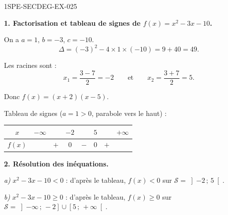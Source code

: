 \begin{corrige}{1SPE-SECDEG-EX-025}

\textbf{1. Factorisation et tableau de signes de $f(x) = x^2 - 3x - 10$.}


On a $a = 1$, $b = -3$, $c = -10$.
\[\Delta = (-3)^2 - 4 \times 1 \times (-10) = 9 + 40 = 49.\]

Les racines sont :
\[x_1 = \frac{3 - 7}{2} = -2 \qquad \text{et} \qquad x_2 = \frac{3 + 7}{2} = 5.\]

Donc $f(x) = (x + 2)(x - 5)$.

Tableau de signes ($a = 1 > 0$, parabole vers le haut) :

\medskip
\begin{center}
\begin{tabular}{|c|ccccccc|}
\hline
$x$ & $-\infty$ & & $-2$ & & $5$ & & $+\infty$ \\
\hline
$f(x)$ & & $+$ & $0$ & $-$ & $0$ & $+$ & \\
\hline
\end{tabular}
\end{center}

\medskip
\textbf{2. Résolution des inéquations.}


\textit{a)} $x^2 - 3x - 10 < 0$ : d'après le tableau, $f(x) < 0$ sur $\mathcal{S} = \left]-2\,;\,5\right[$.

\textit{b)} $x^2 - 3x - 10 \geqslant 0$ : d'après le tableau, $f(x) \geqslant 0$ sur $\mathcal{S} = \left]-\infty\,;\,-2\right] \cup \left[5\,;\,+\infty\right[$.


\end{corrige}

